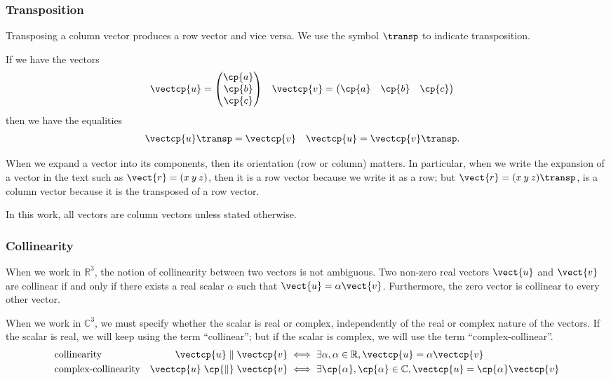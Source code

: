 \begin{refsection}
\subsubsection{Transposition}
Transposing a column vector produces a row vector and vice versa.
We use the symbol $\transp$ to indicate transposition.

If we have the vectors
\begin{align}
    \vectcp{u}
    &=
    \begin{pmatrix}
        \cp{a} \\ \cp{b} \\ \cp{c}
    \end{pmatrix}
    &
    \vectcp{v}
    &=
    \begin{pmatrix}
        \cp{a} & \cp{b} & \cp{c}
    \end{pmatrix}
\end{align}
then we have the equalities
\begin{align}
    \vectcp{u}\transp &= \vectcp{v}
    &
    \vectcp{u}        &= \vectcp{v}\transp
    \text{.}
\end{align}

When we expand a vector into its components, then its orientation (row or column) matters.
In particular, when we write the expansion of a vector in the text such as
$\vect{r}= (x \: y \: z)$,
then it is a row vector because we write it as a row;
but
$\vect{r}= (x \: y \: z)\transp$,
is a column vector because it is the transposed of a row vector.

In this work, all vectors are column vectors unless stated otherwise.

\subsubsection{Collinearity}

When we work in $\mathbb{R}^3$, the notion of collinearity between two vectors is not ambiguous.
Two non-zero real vectors $\vect{u}$ and $\vect{v}$ are collinear
if and only if there exists a real scalar $\alpha$
such that $\vect{u} = \alpha \vect{v}$.
Furthermore, the zero vector is collinear to every other vector.

When we work in $\mathbb{C}^3$, we must specify whether the scalar is real or complex, independently of the real or complex nature of the vectors.
If the scalar is real, we will keep using the term ``collinear'';
but if the scalar is complex, we will use the term ``complex-collinear''.
\begin{align}
    &\text{collinearity}
    &
    \vectcp{u} \parallel \vectcp{v}
    &\iff
    \exists \alpha, \alpha \in \mathbb{R}, \vectcp{u} = \alpha \vectcp{v}
    \\
    &\text{complex-collinearity}
    &
    \vectcp{u} \;\cp{\parallel}\; \vectcp{v}
    &\iff  
    \exists \cp{\alpha}, \cp{\alpha} \in \mathbb{C}, \vectcp{u} = \cp{\alpha} \vectcp{v}
\end{align}


\end{refsection}
